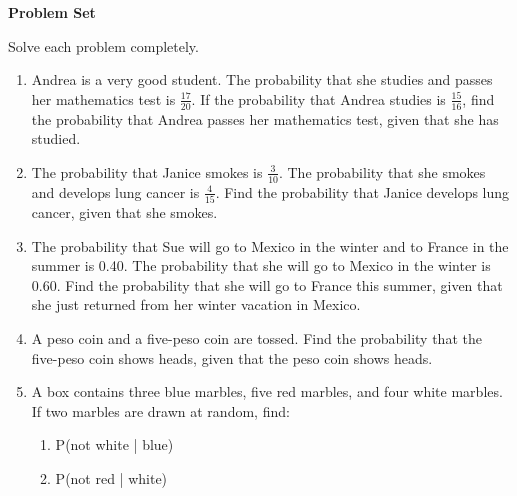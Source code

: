 \textbf{Problem Set}

\vspce

Solve each problem completely.
\begin{enumerate}[label = \arabic*. ]
\item Andrea is a very good student. The probability that she studies and  passes her mathematics test is $\displaystyle \frac{17}{20} $. If the probability that Andrea 
 studies is $\displaystyle \frac{15}{16} $, find the probability that Andrea passes her  mathematics test, given that she has studied. 

\item The probability that Janice smokes is $\displaystyle \frac{3}{10} $. The probability that she  smokes and develops lung cancer is $\displaystyle \frac{4}{15} $. Find the probability that 
 Janice develops lung cancer, given that she smokes.
\item The probability that Sue will go to Mexico in the winter and to France  in the summer is 0.40.  The probability that she will go to Mexico in  the winter is 0.60. Find the probability that she will go to France this 
 summer, given that she just returned from her winter vacation in  Mexico.
\item A peso coin and a five-peso coin are tossed. Find the probability that the five-peso coin 
shows heads, given that the peso coin shows heads. 
\item A box contains three blue marbles, five red marbles, and four white  marbles. If two marbles are drawn at random, find: 
\begin{enumerate}[label = \alph*. ]
\item \hspce P(not white | blue)
\item \hspce P(not red | white)
\end{enumerate} 
 
\end{enumerate} 

